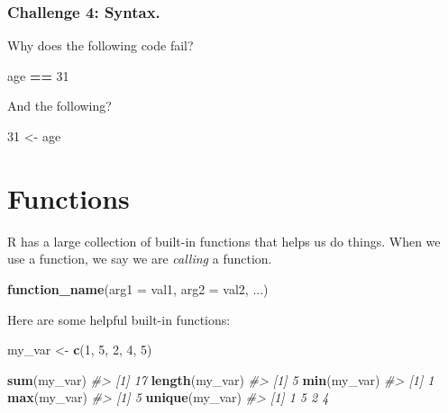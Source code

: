 \documentclass[]{book}
\newenvironment{Shaded}{\begin{snugshade}}{\end{snugshade}}
\newcommand{\KeywordTok}[1]{\textcolor[rgb]{0.13,0.29,0.53}{\textbf{#1}}}
\newcommand{\DataTypeTok}[1]{\textcolor[rgb]{0.13,0.29,0.53}{#1}}
\newcommand{\DecValTok}[1]{\textcolor[rgb]{0.00,0.00,0.81}{#1}}
\newcommand{\StringTok}[1]{\textcolor[rgb]{0.31,0.60,0.02}{#1}}
\newcommand{\CommentTok}[1]{\textcolor[rgb]{0.56,0.35,0.01}{\textit{#1}}}
\newcommand{\OperatorTok}[1]{\textcolor[rgb]{0.81,0.36,0.00}{\textbf{#1}}}
\newcommand{\NormalTok}[1]{#1}
\begin{document}
\subsubsection*{Challenge 4: Syntax.}\label{challenge-4-syntax.}

Why does the following code fail?

\begin{Shaded}
\begin{Highlighting}[]
\NormalTok{age }\OperatorTok{==}\StringTok{ }\DecValTok{31}
\end{Highlighting}
\end{Shaded}

And the following?

\begin{Shaded}
\begin{Highlighting}[]
\DecValTok{31}\NormalTok{ <-}\StringTok{  }\NormalTok{age}
\end{Highlighting}
\end{Shaded}

\section{Functions}\label{functions}

R has a large collection of built-in functions that helps us do things.
When we use a function, we say we are \emph{calling} a function.

\begin{Shaded}
\begin{Highlighting}[]
\KeywordTok{function_name}\NormalTok{(}\DataTypeTok{arg1 =}\NormalTok{ val1, }\DataTypeTok{arg2 =}\NormalTok{ val2, ...)}
\end{Highlighting}
\end{Shaded}

Here are some helpful built-in functions:

\begin{Shaded}
\begin{Highlighting}[]
\NormalTok{my_var <-}\StringTok{ }\KeywordTok{c}\NormalTok{(}\DecValTok{1}\NormalTok{, }\DecValTok{5}\NormalTok{, }\DecValTok{2}\NormalTok{, }\DecValTok{4}\NormalTok{, }\DecValTok{5}\NormalTok{)}

\KeywordTok{sum}\NormalTok{(my_var)}
\CommentTok{#> [1] 17}
\KeywordTok{length}\NormalTok{(my_var)}
\CommentTok{#> [1] 5}
\KeywordTok{min}\NormalTok{(my_var)}
\CommentTok{#> [1] 1}
\KeywordTok{max}\NormalTok{(my_var)}
\CommentTok{#> [1] 5}
\KeywordTok{unique}\NormalTok{(my_var)}
\CommentTok{#> [1] 1 5 2 4}
\end{Highlighting}
\end{Shaded}
\end{document}
